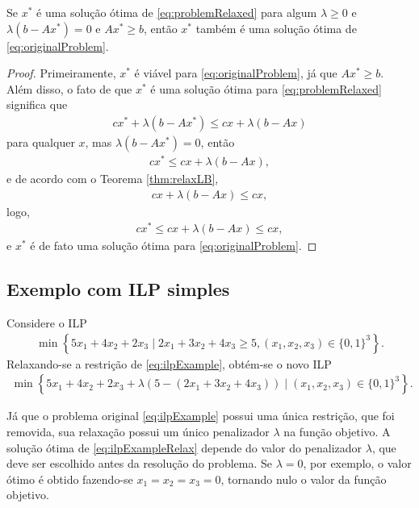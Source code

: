 {\begin{theorem}
	\label{thm:xIsOptimal}
	Se $x^*$ é uma solução ótima de \eqref{eq:problemRelaxed} para algum $\lambda \geq 0$ e $\lambda (b - Ax^*) = 0$ e $Ax^* \geq b$, então $x^*$ também é uma solução ótima de \eqref{eq:originalProblem}.
\end{theorem}
\begin{proof}
	Primeiramente, $x^*$ é viável para \eqref{eq:originalProblem}, já que $Ax^* \geq b$. Além disso, o fato de que $x^*$ é uma solução ótima para \eqref{eq:problemRelaxed} significa que
	\begin{align*}
		cx^* + \lambda (b - Ax^*) \leq cx + \lambda (b - Ax)
	\end{align*}
	para qualquer $x$, mas $\lambda (b - Ax^*) = 0$, então
	\begin{align*}
		cx^* \leq cx + \lambda (b - Ax),
	\end{align*}
	e de acordo com o Teorema \ref{thm:relaxLB}, 
	\begin{align*}
		cx + \lambda (b - Ax) \leq cx,
	\end{align*}
	logo,
	\begin{align*}
		cx^* \leq cx + \lambda (b - Ax) \leq cx,
	\end{align*}
	e $x^*$ é de fato uma solução ótima para \eqref{eq:originalProblem}.
\end{proof}

\subsection{Exemplo com ILP simples}

Considere o ILP 
\begin{align*}
	\min \left\{ 5x_1 + 4x_2 + 2x_3 \mid 2x_1 + 3x_2 + 4x_3 \geq 5, (x_1,x_2,x_3) \in \{0,1\}^3 \right\}. \tag{P1}\label{eq:ilpExample}
\end{align*}
Relaxando-se a restrição de \eqref{eq:ilpExample}, obtém-se o novo ILP
\begin{align*}
	\min \left\{ 5x_1 + 4x_2 + 2x_3 + \lambda(5 - (2x_1 + 3x_2 + 4x_3)) \mid (x_1,x_2,x_3) \in \{0,1\}^3 \right\}. \tag{PR$_\lambda$1}\label{eq:ilpExampleRelax}
\end{align*} 

Já que o problema original \eqref{eq:ilpExample} possui uma única restrição, que foi removida, sua relaxação possui um único penalizador $\lambda$ na função objetivo. A solução ótima de \eqref{eq:ilpExampleRelax} depende do valor do penalizador $\lambda$, que deve ser escolhido antes da resolução do problema. Se $\lambda = 0$, por exemplo, o valor ótimo é obtido fazendo-se $x_1 = x_2 = x_3 = 0$, tornando nulo o valor da função objetivo.

}
